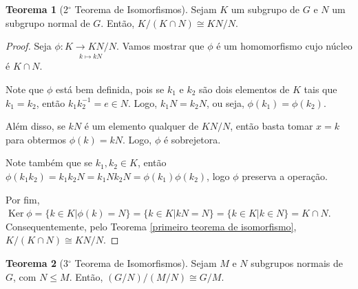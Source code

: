 \documentclass[a4paper,portuguese,11pt,twoside, leqno]{book}
\DeclareMathOperator{\Ker}{Ker}
\theoremstyle{definition}
\newtheorem{theorem}{Teorema}[section]
\newtheorem{example}{Exemplo}[section]
\begin{document}
	
	
	\begin{theorem}[2$^\circ$ Teorema de Isomorfismos]
		\label{segundo teorema de isomorfismos}
		Sejam $K$ um subgrupo de $G$ e $N$ um subgrupo normal de $G$. Então, $K/(K\cap N)\cong KN/N$.
	\end{theorem}
	
	\begin{proof}
		Seja $\phi:\underset{k\mapsto kN}{K\to KN/N}$. Vamos mostrar que $\phi$ é um homomorfismo cujo núcleo é $K\cap N$.
		\par\vspace{0.3cm}
		Note que $\phi$ está bem definida, pois se $k_1$ e $k_2$ são dois elementos de $K$ tais que $k_1=k_2$, então $k_1k_2^{-1} = e\in N$. Logo, $k_1N = k_2N$, ou seja, $\phi(k_1)=\phi(k_2)$.	
		\par\vspace{0.3cm}
		Além disso, se $kN$ é um elemento qualquer de $KN/N$, então basta tomar $x=k$ para obtermos $\phi(k)=kN$. Logo, $\phi$ é sobrejetora. 	
		\par\vspace{0.3cm}
		Note também que se $k_1,k_2\in K$, então $\phi(k_1k_2)=k_1k_2N=k_1Nk_2N=\phi(k_1)\phi(k_2)$, logo $\phi$ preserva a operação.	
		\par\vspace{0.3cm}
		Por fim, $\Ker\phi= \{ k\in K | \phi(k) = N \} = \{ k\in K | kN = N \}= \{ k\in K | k\in N \} = K\cap N$. Consequentemente, pelo Teorema \eqref{primeiro teorema de isomorfismo},  $K/(K\cap N)\cong KN/N$.  
	\end{proof}
	
	\par\vspace{0.3cm}
	
	\begin{theorem}[3$^\circ$ Teorema de Isomorfismos]
		\label{terceiro teorema de isomorfismos}
		Sejam $M$ e $N$ subgrupos normais de $G$, com $N\leq M$. Então, $(G/N)/(M/N)\cong G/M$.
	\end{theorem}
	
\end{document}
